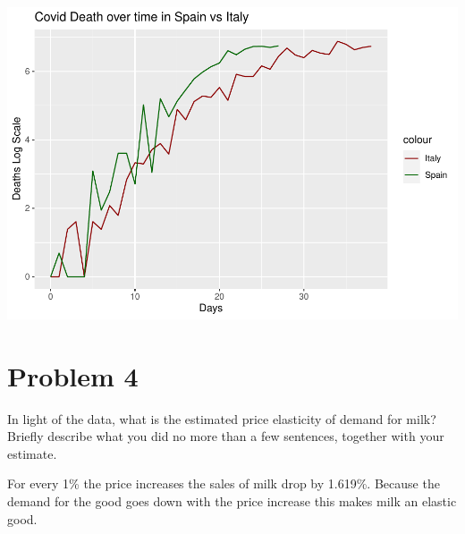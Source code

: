 \documentclass[
]{article}
\begin{document}
\includegraphics{HW3_files/figure-latex/unnamed-chunk-8-1.pdf}

\hypertarget{problem-4}{%
\section{Problem 4}\label{problem-4}}

In light of the data, what is the estimated price elasticity of demand
for milk? Briefly describe what you did no more than a few sentences,
together with your estimate.

For every 1\% the price increases the sales of milk drop by 1.619\%.
Because the demand for the good goes down with the price increase this
makes milk an elastic good.
\end{document}

